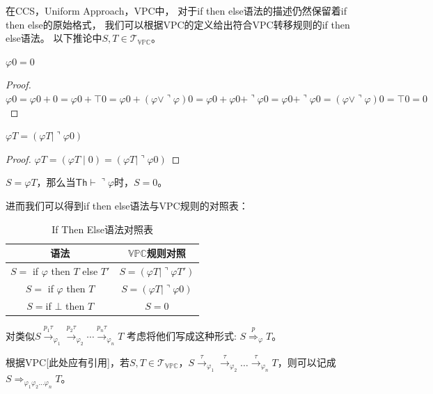 在CCS，Uniform Approach，VPC中，
对于if then else语法的描述仍然保留着if then else的原始格式，
我们可以根据VPC的定义给出符合VPC转移规则的if then else语法。
以下推论中$S,T\in \mathcal{T}_{\mathbb{VPC}}$。
\begin{corollary} 
   $\varphi 0 = 0$
\end{corollary}
\begin{proof}
   $\varphi 0 = \varphi 0 + 0 = \varphi 0 + \top 0 = \varphi 0 + (\varphi \vee \urcorner \varphi)0 = \varphi 0 + \varphi 0 + \urcorner \varphi 0 = \varphi 0 + \urcorner \varphi 0 = (\varphi \vee \urcorner \varphi)0 = \top 0 = 0$
\end{proof}
\begin{corollary}
   $\varphi T = (\varphi T\mid \urcorner \varphi 0)$
\end{corollary}
\begin{proof}
   $\varphi T = (\varphi T\mid 0) = (\varphi T\mid \urcorner \varphi 0)$
\end{proof}
\begin{corollary}
   $S=\varphi T$，那么当$\mathsf{Th}\vdash \urcorner \varphi$时，$S=0$。
\end{corollary}
进而我们可以得到if then else语法与VPC规则的对照表：
\begin{table}[!hpt]
   \caption[If Then Else语法对照表]{If Then Else语法对照表\footnotemark}
   \label{tab:ifthenelse}
   \centering
   \begin{tabular}{@{}cc@{}} \toprule
     语法 & $\mathbb{VPC}$规则对照 \\ \midrule
     $S=$ if $\varphi$ then $T$ else $T'$& $S=(\varphi T|\urcorner \varphi T')$\\
     $S=$ if $\varphi$ then $T$ & $S=(\varphi T|\urcorner\varphi 0)$\\
     $S = $if $\bot$ then $T$ & $S=0$\\ \bottomrule
   \end{tabular}
 \end{table}

对类似$S\stackrel{p_1\tau}{\rightarrow}_{\varphi_1}\stackrel{p_2\tau}{\rightarrow}_{\varphi_2}\cdots\stackrel{p_n\tau}{\rightarrow}_{\varphi_n} T$
考虑将他们写成这种形式: $S\stackrel{p}{\Rightarrow}_{\varphi} T$。

\begin{definition}\label{def:continous_vpc}
   根据VPC[此处应有引用]，若$S,T\in \mathcal{T}_{\mathbb{VPC}}$，$S\stackrel{\tau}{\rightarrow}_{\varphi_1}\stackrel{\tau}{\rightarrow}_{\varphi_2}\dots \stackrel{\tau}{\rightarrow}_{\varphi_n} T$，则可以记成$S\stackrel{}{\Rightarrow}_{\varphi_1\varphi_2\dots\varphi_n} T$。
\end{definition} 

